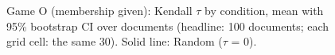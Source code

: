 \begin{figure}[t]\centering

\caption{Game O (membership given): Kendall $\tau$ by condition, mean with 95\% bootstrap CI over documents (headline: 100 documents; each grid cell: the same 30). Solid line: Random ($\tau$ = 0).}
\label{fig:4}
\end{figure}
